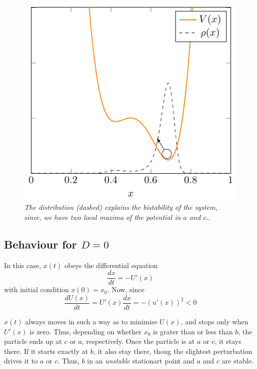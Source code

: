 \begin{figure}[h]
\centering
\includegraphics[scale=1.2]{images/kramerpot.pdf}
\caption{\emph{The distribution (dashed) explains the bistability of the system, since, we have two local maxima of the potential in $a$ and $c$..}}
\label{fig:kramerpot}
\end{figure}

\subsection{Behaviour for $D=0$}
In this case, $x(t)$ obeys the differential equation
\begin{equation}
\frac{dx}{dt} = - U'(x)
\end{equation}
with initial condition $x(0) = x_0$.
Now, since
$$
\frac{dU(x)}{dt} = U'(x)\frac{dx}{dt} = - (u'(x))^2 < 0 
$$

$x(t)$ always moves in such a way as to minimise $U(x)$, and stops only when $U'(x)$ is zero. Thus, depending on whether $x_0$ is grater than or less than $b$, the particle ends up at $c$ or $a$, respectively. Once the particle is at $a$ or $c$, it stays there. If it starts exactly at $b$, it also stay there, thoug the slightest perturbation drives it to $a$ or $c$. Thus, $b$ in an \emph{unstable} stationart point and $a$ and $c$ are stable.
